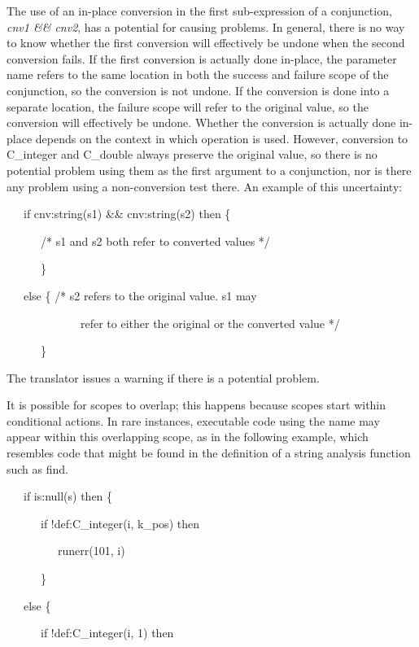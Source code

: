 The use of an in-place conversion in the first sub-expression of a
conjunction, \textit{cnv1 \&\& cnv2}, has a potential for causing
problems. In general, there is no way to know whether the first
conversion will effectively be undone when the second conversion
fails. If the first conversion is actually done in-place, the
parameter name refers to the same location in both the success and
failure scope of the conjunction, so the conversion is not undone. If
the conversion is done into a separate location, the failure scope
will refer to the original value, so the conversion will effectively
be undone. Whether the conversion is actually done in-place depends on
the context in which operation is used. However, conversion to
C\_integer and C\_double always preserve the original value, so there
is no potential problem using them as the first argument to a
conjunction, nor is there any problem using a non-conversion test
there.  An example of this uncertainty:

{\ttfamily\mdseries
\ \ \ if cnv:string(s1) \&\& cnv:string(s2) then \{}

{\ttfamily\mdseries
\ \ \ \ \ \ /* s1 and s2 both refer to converted values */}

{\ttfamily\mdseries
\ \ \ \ \ \ \}}

{\ttfamily\mdseries
\ \ \ else \{ /* s2 refers to the original value. s1 may}

{\ttfamily\mdseries
\ \ \ \ \ \ \ \ \ \ \ \ \ refer to either the original or the converted value */}

{\ttfamily\mdseries
\ \ \ \ \ \ \}}


The translator issues a warning if there is a potential problem. 

It is possible for scopes to overlap; this happens because scopes
start within conditional actions. In rare instances, executable code
using the name may appear within this overlapping scope, as in the
following example, which resembles code that might be found in the
definition of a string analysis function such as find.

{\ttfamily\mdseries
\ \ \ if is:null(s) then \{}

{\ttfamily\mdseries
\ \ \ \ \ \ if !def:C\_integer(i, k\_pos) then}

{\ttfamily\mdseries
\ \ \ \ \ \ \ \ \ runerr(101, i)}

{\ttfamily\mdseries
\ \ \ \ \ \ \}}

{\ttfamily\mdseries
\ \ \ else \{}

{\ttfamily\mdseries
\ \ \ \ \ \ if !def:C\_integer(i, 1) then}

